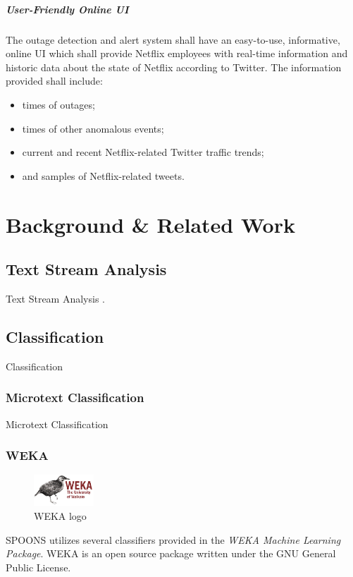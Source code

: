 \documentclass[12pt]{ucthesis}
\begin{document}
\paragraph{User-Friendly Online UI}
The outage detection and alert system shall have an easy-to-use, informative,
online UI which shall provide Netflix employees with real-time information and
historic data about the state of Netflix according to Twitter. The information
provided shall include:

\begin{itemize}
   \item times of outages;
   \item times of other anomalous events;
   \item current and recent Netflix-related Twitter traffic trends;
   \item and samples of Netflix-related tweets.
\end{itemize}

\chapter{Background \& Related Work}
\label{background-related-work}

\section{Text Stream Analysis}
\label{background-text-stream}
Text Stream Analysis \cite{Bansal}\cite{Grinev}\cite{Huang}.

\section{Classification}
\label{background-classification}
Classification \cite{Pang}

\subsection{Microtext Classification}
\label{background-microtext-classification}
Microtext Classification \cite{hong}

\subsection{WEKA}
\label{background-weka}
\begin{figure}
  \begin{center}
    \includegraphics[width=0.20\textwidth]{images/weka.eps}
  \end{center}
  \caption{WEKA logo}
\end{figure}
SPOONS utilizes several classifiers provided in the \textit{WEKA Machine Learning Package}.
WEKA is an open source package written under the GNU General Public License\cite{weka}.
\end{document}
